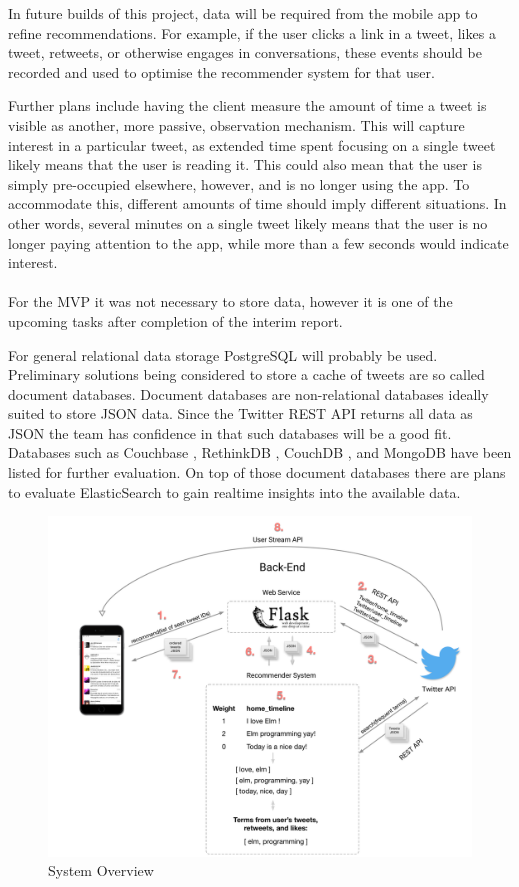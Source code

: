 \documentclass{article}
\begin{document}
In future builds of this project, data will be required from the mobile app to refine recommendations. For example, if the user clicks a link in a tweet, likes a tweet, retweets, or otherwise engages in conversations, these events should be recorded and used to optimise the recommender system for that user. 

Further plans include having the client measure the amount of time a tweet is visible as another, more passive, observation mechanism. This will capture interest in a particular tweet, as extended time spent focusing on a single tweet likely means that the user is reading it. This could also mean that the user is simply pre-occupied elsewhere, however, and is no longer using the app. To accommodate this, different amounts of time should imply different situations. In other words, several minutes on a single tweet likely means that the user is no longer paying attention to the app, while more than a few seconds would indicate interest.
\\\\
For the MVP it was not necessary to store data, however it is one of the upcoming tasks after completion of the interim report. 

For general relational data storage PostgreSQL will probably be used. Preliminary solutions being considered to store a cache of tweets are so called document databases. Document databases are non-relational databases ideally suited to store JSON data. Since the Twitter REST API returns all data as JSON the team has confidence in that such databases will be a good fit. Databases such as Couchbase \cite{couchbase}, RethinkDB \cite{rethinkdb}, CouchDB \cite{couchdb}, and MongoDB \cite{mongodb} have been listed for further evaluation. On top of those document databases there are plans to evaluate ElasticSearch \cite{elasticsearch} to gain realtime insights into the available data.


\begin{figure}[H]
    \centering
    \includegraphics[width=\textwidth]{data_flow_white}  
    \caption{System Overview}
\end{figure}
\end{document}
